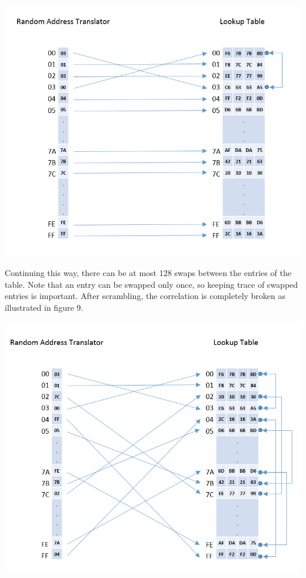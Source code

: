 \begin{center}
\includegraphics[scale=0.38,natwidth=785,natheight=666]{Figures/rat-step-1.png}
\label{fig: Random Address Translator after first swap.}
\end{center}

Continuing this way, there can be at most 128 swaps between the entries of the table. Note that an entry can be swapped only once, so keeping trace of swapped entries is important. After scrambling, the correlation is completely broken as illustrated in figure 9.

\begin{center}
\includegraphics[scale=0.38,natwidth=785,natheight=666]{Figures/rat-scrambled(new).png}
\label{fig: Random Address Translator Scrambled.}
\end{center}

